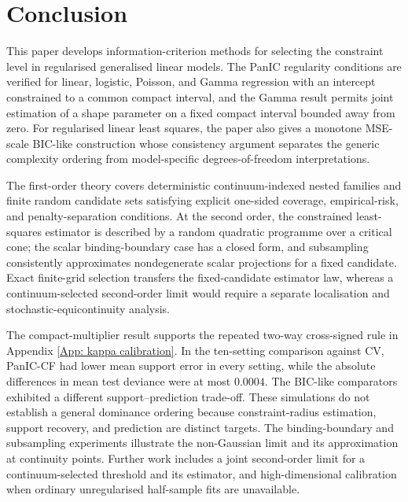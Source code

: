 \documentclass[12pt]{article}
\newenvironment{bluechange}{\begingroup\color[rgb]{0.00,0.00,1.00}}{\endgroup}
\theoremstyle{remark}
\theoremstyle{plain}
\begin{document}
\section{Conclusion}\label{Sect: Conclusion}
\begin{bluechange}
This paper develops information-criterion methods for selecting the constraint level in regularised generalised linear models. The PanIC regularity conditions are verified for linear, logistic, Poisson, and Gamma regression with an intercept constrained to a common compact interval, and the Gamma result permits joint estimation of a shape parameter on a fixed compact interval bounded away from zero. For regularised linear least squares, the paper also gives a monotone MSE-scale BIC-like construction whose consistency argument separates the generic complexity ordering from model-specific degrees-of-freedom interpretations.

The first-order theory covers deterministic continuum-indexed nested families and finite random candidate sets satisfying explicit one-sided coverage, empirical-risk, and penalty-separation conditions. At the second order, the constrained least-squares estimator is described by a random quadratic programme over a critical cone; the scalar binding-boundary case has a closed form, and subsampling consistently approximates nondegenerate scalar projections for a fixed candidate. Exact finite-grid selection transfers the fixed-candidate estimator law, whereas a continuum-selected second-order limit would require a separate localisation and stochastic-equicontinuity analysis.

The compact-multiplier result supports the repeated two-way cross-signed rule in Appendix \ref{App: kappa calibration}. In the ten-setting comparison against CV, PanIC-CF had lower mean support error in every setting, while the absolute differences in mean test deviance were at most $0.0004$. The BIC-like comparators exhibited a different support--prediction trade-off. These simulations do not establish a general dominance ordering because constraint-radius estimation, support recovery, and prediction are distinct targets. The binding-boundary and subsampling experiments illustrate the non-Gaussian limit and its approximation at continuity points. Further work includes a joint second-order limit for a continuum-selected threshold and its estimator, and high-dimensional calibration when ordinary unregularised half-sample fits are unavailable.
\end{bluechange}
\end{document}
